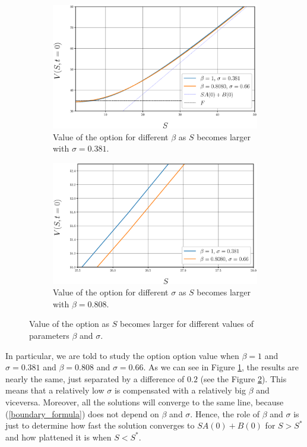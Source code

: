 \begin{figure}[htbp]
	\centering
	\captionsetup{width=.5\linewidth}
	\begin{subfigure}[b]{0.49\textwidth}
		\includegraphics[width=\textwidth]{img/Q1/ComparisonGivenBetaAndSigma.eps}
		\captionsetup{width=.8\linewidth}
		\caption{Value of the option for different $\beta$ as $S$ becomes larger with $\sigma = 0.381$.}
		\label{withoutZoom}
	\end{subfigure}
	\begin{subfigure}[b]{0.49\textwidth}
		\includegraphics[width=\textwidth]{img/Q1/ComparisonGivenBetaAndSigmaZoom.eps}
		\captionsetup{width=.8\linewidth}
		\caption{Value of the option for different $\sigma$ as $S$ becomes larger with $\beta=0.808$.}
		\label{withZoom}
	\end{subfigure}
	\caption{Value of the option as $S$ becomes larger for different values of parameters $\beta$ and $\sigma$.}
	\label{StudyingBetaSigma}
\end{figure}

In particular, we are told to study the option option value when $\beta=1$ and $\sigma = 0.381$ and $\beta=0.808$ and $\sigma=0.66$. As we can see in Figure \ref{withoutZoom}, the results are nearly the same, just separated by a difference of $0.2$ (see the Figure \ref{withZoom}). This means that a relatively low $\sigma$ is compensated with a relatively big $\beta$ and viceversa. Moreover, all the solutions will converge to the same line, because  (\ref{boundary_formula}) does not depend on $\beta$ and $\sigma$. Hence, the role of $\beta$ and $\sigma$ is just to determine how fast the solution converges to $SA(0) + B(0)$ for $S>S^*$ and how plattened it is when $S<S^*$.


